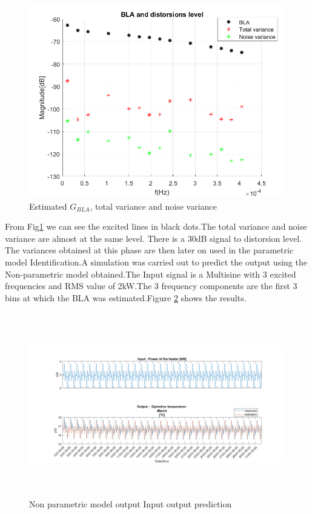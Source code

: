 \documentclass[a4paper,12pt]{report}
\numberwithin{equation}{section}
\begin{document}
\begin{figure}[H]
    \includegraphics[width=\textwidth]{bla.png}
    \caption{Estimated $G_{BLA}$, total variance and noise variance}
    \label{fig:BLA}
\end{figure}

From Fig\ref{fig:BLA} we can see the excited lines in black dots.The total variance and noise variance are almost at  the same level. There is a 30dB signal to distorsion level. The variances obtained at this phase are then later on used in the parametric model Identification.A simulation was carried out to predict the output using the Non-parametric model obtained.The Input signal is a Multisine with 3 excited frequencies and RMS value of 2kW.The 3 frequency components are the first 3 bins at which the BLA was estimated.Figure \ref{fig:Npinputoutput} shows the results.

\begin{figure}[H]
    \includegraphics[width=\textwidth, height=8cm]{Np_In_oUT.png}
    \centering
    \caption{Non parametric model output Input output prediction}
    \label{fig:Npinputoutput}
\end{figure}
\end{document}

